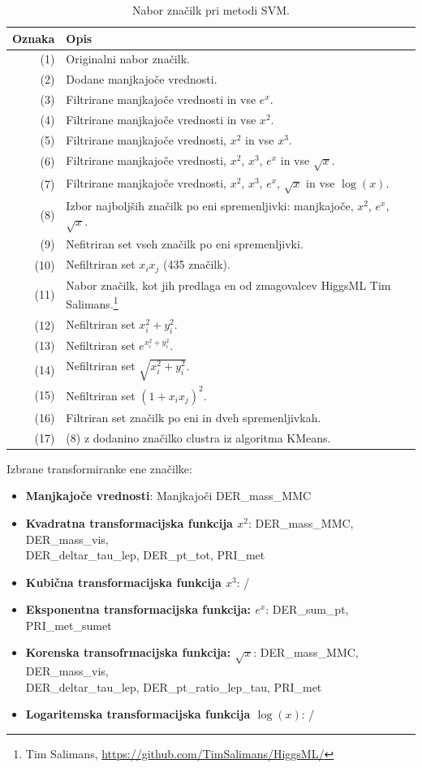 \documentclass[11pt,a4paper,openany]{book}
\begin{document}
\begin{table}[h!]
	\centering
	\begin{tabular}{r|l}
		\textbf{Oznaka} & \textbf{Opis} \\
		\hline
		(1) & Originalni nabor značilk. \\
		(2) & Dodane manjkajoče vrednosti. \\
		(3) & Filtrirane manjkajoče vrednosti in vse $e^x$. \\
		(4) & Filtrirane manjkajoče vrednosti in vse $x^2$. \\
		(5) & Filtrirane manjkajoče vrednosti, $x^2$ in vse $x^3$. \\
		(6) & Filtrirane manjkajoče vrednosti, $x^2$, $x^3$, $e^x$ in vse $\sqrt{x}$. \\
		(7) & Filtrirane manjkajoče vrednosti, $x^2$, $x^3$, $e^x$, $\sqrt{x}$ in vse $\log(x)$. \\
		(8) & Izbor najboljših značilk po eni spremenljivki: manjkajoče, $x^2$, $e^x$, $\sqrt{x}$. \\
		(9) & Nefitriran set vseh značilk po eni spremenljivki. \\
		(10) & Nefiltriran set $x_ix_j$ (435 značilk). \\
		(11) & Nabor značilk, kot jih predlaga en od zmagovalcev HiggsML Tim Salimans.\footnote{Tim Salimans, \url{https://github.com/TimSalimans/HiggsML/}} \\
		(12) & Nefiltriran set $x_i^2 + y_i^2$. \\
		(13) & Nefiltriran set $e^{x_i^2 + y_i^2}$. \\		
		(14) & Nefiltriran set $\sqrt{x_i^2 + y_i^2}$. \\
		(15) & Nefiltriran set $(1 + x_ix_j)^2$. \\
		(16) & Filtriran set značilk po eni in dveh spremenljivkah. \\
		(17) & (8) z dodanino značilko clustra iz algoritma KMeans. \\
	\end{tabular}
	\caption{Nabor značilk pri metodi SVM.}	
\end{table}

Izbrane transformiranke ene značilke:
\begin{itemize}
	\item \textbf{Manjkajoče vrednosti}: Manjkajoči DER\_mass\_MMC
	\item \textbf{Kvadratna transformacijska funkcija $x^2$}: DER\_mass\_MMC, DER\_mass\_vis, \\ 
		DER\_deltar\_tau\_lep, DER\_pt\_tot, PRI\_met
	\item \textbf{Kubična transformacijska funkcija $x^3$}: /
	\item \textbf{Eksponentna transformacijska funkcija: $e^x$}: DER\_sum\_pt, PRI\_met\_sumet
	\item \textbf{Korenska transofrmacijska funkcija: $\sqrt{x}$}: DER\_mass\_MMC, DER\_mass\_vis, \\	DER\_deltar\_tau\_lep, DER\_pt\_ratio\_lep\_tau, PRI\_met
	\item \textbf{Logaritemska transformacijska funkcija $\log(x)$}: /
\end{itemize}
\end{document}

